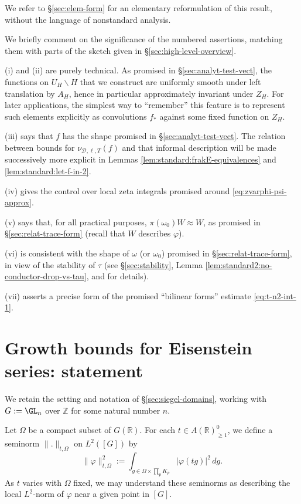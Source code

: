 We refer to \S\ref{sec:elem-form} for an elementary reformulation of this result, without the language of nonstandard analysis.
\begin{remark}\label{rmk:we-briefly-comment}
  We briefly comment on the significance of the numbered assertions, matching them with parts of the sketch given in \S\ref{sec:high-level-overview}.

  (i) and (ii) are purely technical.  As promised in \S\ref{sec:analyt-test-vect}, the functions on $U_{H} \backslash H$ that we construct are uniformly smooth under left translation by $A_H$, hence in particular approximately invariant under $Z_H$.  For later applications, the simplest way to ``remember'' this feature is to represent such elements explicitly as convolutions $f_{\ast}$ against some fixed function on $Z_H$.

  (iii) says that $f$ has the shape promised in \S\ref{sec:analyt-test-vect}.  The relation between bounds for $\nu_{\mathcal{D},\ell,T}(f)$ and that informal description will be made successively more explicit in Lemmas \ref{lem:standard:frakE-equivalences} and \ref{lem:standard:let-f-in-2}.

  (iv) gives the control over local zeta integrals promised around \eqref{eq:zvarphi-psi-approx}.

  (v) says that, for all practical purposes, $\pi(\omega_0) W \approx W$, as promised in \S\ref{sec:relat-trace-form} (recall that $W$ describes $\varphi$).

  (vi) is consistent with the shape of $\omega$ (or $\omega_0$) promised in \S\ref{sec:relat-trace-form}, in view of the stability of $\tau$ (see \S\ref{sec:stability}, Lemma \ref{lem:standard2:no-conductor-drop-vs-tau}, \cite[Thm 17.1]{nelson-venkatesh-1} and \cite[\S14.9]{2020arXiv201202187N} for details).

  (vii) asserts a precise form of the promised ``bilinear forms'' estimate \eqref{eq:t-n2-int-1}.
\end{remark}


\section{Growth bounds for Eisenstein series: statement}\label{sec:cnpy9ba61h}
We retain the setting and notation of \S\ref{sec:siegel-domains}, working with $G := \GL_n$ over $\mathbb{Z}$ for some natural number $n$.

Let $\Omega$ be a compact subset of $G(\mathbb{R})$.  For each $t \in A(\mathbb{R})^0_{\geq 1}$, we define a seminorm $\|.\|_{t,\Omega}$ on $L^2([G])$ by
\begin{equation}\label{eq:varphi-2_r-:=}
  \|\varphi \|^2_{t,\Omega} :=
  \int_{g \in \Omega \times \prod_p K_p }
  |\varphi(t g)|^2
  \, d g.
\end{equation}
As $t$ varies with $\Omega$ fixed, we may understand these seminorms as describing the local $L^2$-norm of $\varphi$ near a given point in $[G]$.

